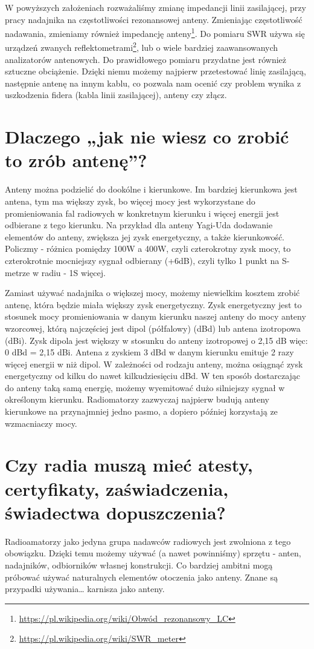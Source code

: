\documentclass[a4paper,12pt]{article}
\begin{document}
W powyższych założeniach rozważaliśmy zmianę impedancji linii zasilającej, przy pracy nadajnika na częstotliwości rezonansowej anteny. Zmieniając częstotliwość nadawania, zmieniamy również impedancję anteny\footnote{\url{https://pl.wikipedia.org/wiki/Obwód_rezonansowy_LC}}.
Do pomiaru SWR używa się urządzeń zwanych reflektometrami\footnote{\url{https://pl.wikipedia.org/wiki/SWR_meter}}, lub o wiele bardziej zaawansowanych analizatorów antenowych.
Do prawidłowego pomiaru przydatne jest również sztuczne obciążenie. Dzięki niemu możemy najpierw przetestować linię zasilającą, następnie antenę na innym kablu, co pozwala nam ocenić czy problem wynika z uszkodzenia fidera (kabla linii zasilającej), anteny czy złącz.

\section{Dlaczego „jak nie wiesz co zrobić to zrób antenę”?}
Anteny można podzielić do dookólne i kierunkowe. Im bardziej kierunkowa jest antena, tym ma większy zysk, bo więcej mocy jest wykorzystane do promieniowania fal radiowych w konkretnym kierunku i więcej energii jest odbierane z tego kierunku. Na przykład dla anteny Yagi-Uda dodawanie elementów do anteny, zwiększa jej zysk energetyczny, a także kierunkowość.
Policzmy - różnica pomiędzy 100W a 400W, czyli czterokrotny zysk mocy, to czterokrotnie mocniejszy sygnał odbierany (+6dB), czyli tylko 1 punkt na S-metrze w radiu - 1S więcej.

Zamiast używać nadajnika o większej mocy, możemy niewielkim kosztem zrobić antenę, która będzie miała większy zysk energetyczny. Zysk energetyczny jest to stosunek mocy promieniowania w danym kierunku naszej anteny do mocy anteny wzorcowej, którą najczęściej jest dipol (półfalowy) (dBd) lub antena izotropowa (dBi). Zysk dipola jest większy w stosunku do anteny izotropowej o 2,15 dB więc: 0 dBd = 2,15 dBi. Antena z zyskiem 3 dBd w danym kierunku emituje 2 razy więcej energii w niż dipol. W zależności od rodzaju anteny, można osiągnąć zysk energetyczny od kilku do nawet kilkudziesięciu dBd. W ten sposób dostarczając do anteny taką samą energię, możemy wyemitować dużo silniejszy sygnał w określonym kierunku. Radiomatorzy zazwyczaj najpierw budują anteny kierunkowe na przynajmniej jedno pasmo, a dopiero później korzystają ze wzmacniaczy mocy.

\section{Czy radia muszą mieć atesty, certyfikaty, zaświadczenia, świadectwa dopuszczenia?}
Radioamatorzy jako jedyna grupa nadawców radiowych jest zwolniona z tego obowiązku. Dzięki temu możemy używać (a nawet powinniśmy) sprzętu - anten, nadajników, odbiorników własnej konstrukcji. Co bardziej ambitni mogą próbować używać naturalnych elementów otoczenia jako anteny. Znane są przypadki używania… karnisza jako anteny.
\end{document}
